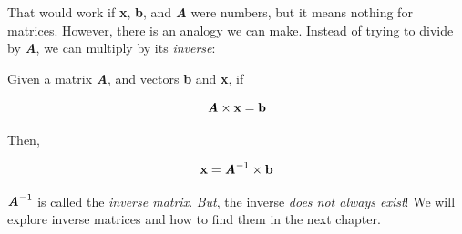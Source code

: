 That would work if \textbf{x}, \textbf{b}, and \textbf{\textit{A}} were numbers, but it means nothing for matrices. However, there is an analogy we can make. Instead of trying to divide by \textbf{\textit{A}}, we can multiply by its \textit{inverse}:

\begin{mdframed}[style = important, frametitle = {Inverse Matrices}]
Given a matrix \textbf{\textit{A}}, and vectors \textbf{b} and \textbf{x}, if

$$\textbf{\textit{A}} \times \textbf{x} = \textbf{b}$$

Then,

$$\textbf{x} = \textbf{\textit{A}}^{-1} \times \textbf{b}$$
\end{mdframed}

$\textbf{\textit{A}}^{-1}$ is called the \textit{inverse matrix}. \emph{But}, the inverse \emph{does not always exist}! We will explore inverse matrices and how to find them in the next chapter.

